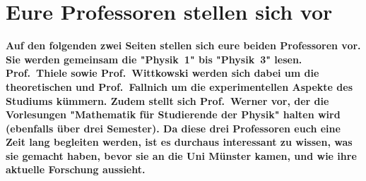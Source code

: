\section[Eure Profs stellen sich vor]{Eure Professoren stellen sich vor}
\textbf{Auf den folgenden zwei Seiten stellen sich eure beiden Professoren vor.
    Sie werden gemeinsam die "Physik~1" bis "Physik~3" lesen.
    Prof.\ Thiele sowie Prof.\ Wittkowski werden sich dabei um die theoretischen und Prof.\ Fallnich um die experimentellen Aspekte des Studiums kümmern.
    Zudem stellt sich Prof.\ Werner vor, der die Vorlesungen "Mathematik für Studierende der Physik" halten wird (ebenfalls über drei Semester).
	Da diese drei Professoren euch eine Zeit lang begleiten werden, ist es durchaus interessant zu wissen, was sie gemacht haben, bevor sie an die Uni Münster kamen, und wie ihre aktuelle Forschung aussieht.}

